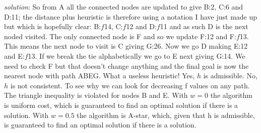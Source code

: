 \documentclass[a4paper,12pt]{article}
\begin{document}
\textsl{solution}: So from A all the connected nodes are updated to
give B:2, C:6 and D:11; the distance plus heuristic is therefore using a notation I have just made up but which is hopefully clear:
B:$f$14, C:$f$12 and D:$f$11 and as such D is the next noded visited. The
only connected node is F and so we update F:12 and F:$f$13. This means
the next node to visit is C giving G:26. Now we go D making E:12 and
E:$f$13. If we break the tie alphabetically we go to E next giving
G:14. We need to check F but that doesn't change anything and the
final goal is now the nearest node with path ABEG. What a useless
heuristic! Yes, $h$ is admissible. No, $h$ is not consistent. To see
why we can look for decreasing f values on any path. The triangle
inequality is violated for nodes B and E. With $w = 0$ the algorithm
is uniform cost, which is guaranteed to find an optimal solution if
there is a solution.  With $w = 0.5$ the algorithm is A-star, which,
given that h is admissible, is guaranteed to find an optimal solution
if there is a solution.
\end{document}
